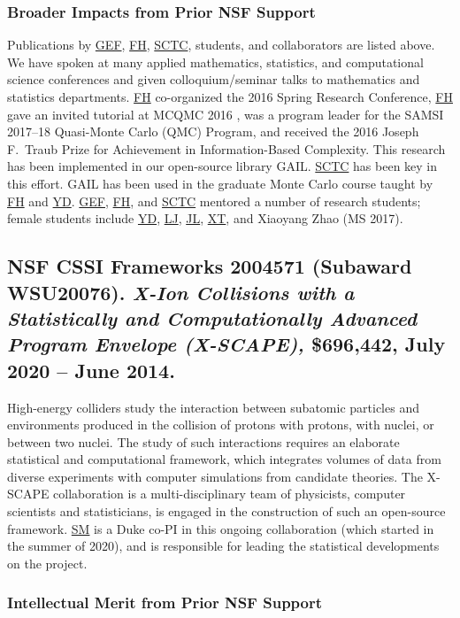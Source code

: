 \documentclass[11pt]{NSFamsart}
\newcommand{\FH}{\hyperlink{FHlink}{FH}\xspace}
\newcommand{\SM}{\hyperlink{SMlink}{SM}\xspace}
\newcommand{\SCTC}{\hyperlink{SCTClink}{SCTC}\xspace}
\newcommand{\GEF}{\hyperlink{GEFlink}{GEF}\xspace}
\newcommand{\YD}{\hyperlink{YDlink}{YD}\xspace}
\newcommand{\LJ}{\hyperlink{LJlink}{LJ}\xspace}
\newcommand{\XT}{\hyperlink{XTlink}{XT}\xspace}
\newcommand{\JL}{\hyperlink{JLlink}{JL}\xspace}
\newcommand{\GAIL}{GAIL\xspace}
\begin{document}
\subsubsection{Broader Impacts from Prior NSF Support} \label{prevBIsect}
Publications by \GEF, \FH,  \SCTC, students, and collaborators are listed above.  We have spoken at many applied mathematics, statistics,
and computational science conferences and given colloquium/seminar talks to mathematics and
statistics departments.  \FH co-organized the
2016 Spring Research
Conference, \FH gave an invited tutorial
at MCQMC 2016
\cite{Hic17a}, was a program leader for the SAMSI 2017--18 Quasi-Monte Carlo (QMC) Program, and received the 2016 Joseph F.\ Traub Prize for Achievement in Information-Based Complexity.  This research has been implemented in our open-source library
\GAIL \cite{ChoEtal21a}.  \SCTC has been key in this effort.  \GAIL has been used in the graduate Monte Carlo course taught by \FH and \YD. \GEF, \FH, and \SCTC mentored a number of
research students;  female students include \YD, \LJ, \JL, \XT, and Xiaoyang Zhao (MS 2017).



\subsection{NSF CSSI Frameworks 2004571 (Subaward WSU20076). \textit{X-Ion Collisions with a Statistically and Computationally Advanced Program Envelope (X-SCAPE),} \$696,442, July 2020 -- June 2014.} High-energy colliders study the interaction between subatomic particles and environments produced in the collision of protons with protons, with nuclei, or between two nuclei. The study of such interactions requires an elaborate statistical and computational framework, which integrates volumes of data from diverse experiments with computer simulations from candidate theories. The X-SCAPE collaboration is a multi-disciplinary team of physicists, computer scientists and statisticians, is engaged in the construction of such an open-source framework. \SM is a Duke co-PI in this ongoing collaboration (which started in the summer of 2020), and is responsible for leading the statistical developments on the project.

\subsubsection{Intellectual Merit from Prior NSF Support}
\end{document}
